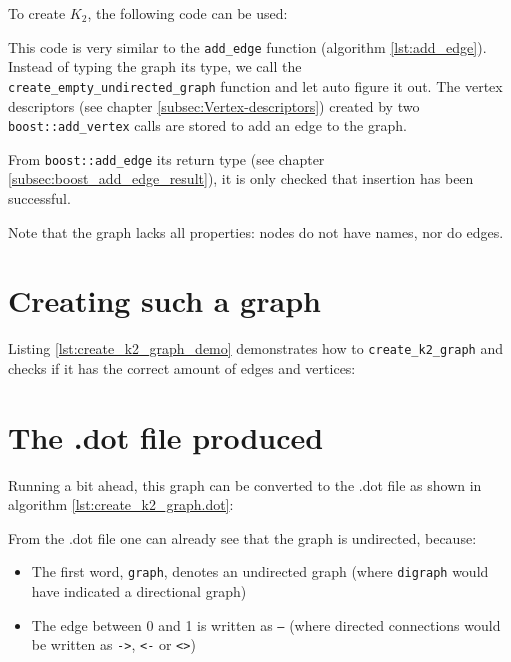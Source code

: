 To create $K_{2}$, the following code can be used:



This code is very similar to 
the \verb;add_edge; function (algorithm \ref{lst:add_edge}).
Instead of typing the graph its type, 
we call the \verb;create_empty_undirected_graph; 
function and let auto figure it out.
The vertex descriptors 
(see chapter \ref{subsec:Vertex-descriptors}) 
created by two \verb;boost::add_vertex; 
calls are stored to add an edge to the graph.

From \verb;boost::add_edge; 
its return type 
(see chapter \ref{subsec:boost_add_edge_result}), 
it is only checked that insertion has been successful.

Note that the graph lacks all properties: nodes do not have names, nor do
edges.

\section{Creating such a graph}

Listing \ref{lst:create_k2_graph_demo}
demonstrates how to \verb;create_k2_graph; and checks if it has the correct
amount of edges and vertices:



\section{The .dot file produced}
\label{subsec:create_k2_dot}

Running a bit ahead, this graph can be converted to the .dot file as shown
in algorithm \ref{lst:create_k2_graph.dot}:



From the .dot file one can already see that the graph is undirected, because:

\begin{itemize}
  \item The first word, \verb;graph;, denotes an undirected graph 
    (where \verb;digraph; would have indicated a directional graph)
  \item The edge between 0 and 1 is written as \verb;–; 
    (where directed connections would be written as \verb;->;, 
    \verb;<-; or \verb;<>;)
\end{itemize}

